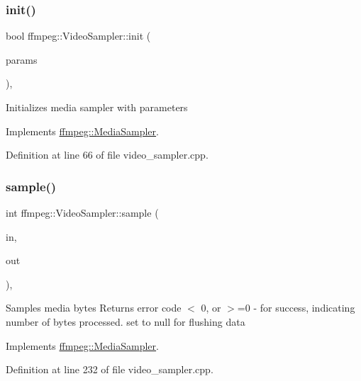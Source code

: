 \subsubsection{\texorpdfstring{init()}{init()}}
{\footnotesize\ttfamily bool ffmpeg\+::\+Video\+Sampler\+::init (\begin{DoxyParamCaption}\item[{const \hyperlink{structffmpeg_1_1SamplerParameters}{Sampler\+Parameters} \&}]{params }\end{DoxyParamCaption})\hspace{0.3cm}{\ttfamily [override]}, {\ttfamily [virtual]}}

Initializes media sampler with parameters 

Implements \hyperlink{classffmpeg_1_1MediaSampler_a049962d62fc930c67d6cf5aa89ae1948}{ffmpeg\+::\+Media\+Sampler}.



Definition at line 66 of file video\+\_\+sampler.\+cpp.

\mbox{\label{classffmpeg_1_1VideoSampler_aaafa56981b07358bd41603c06fc5e92c}} 
\subsubsection{\texorpdfstring{sample()}{sample()}}
{\footnotesize\ttfamily int ffmpeg\+::\+Video\+Sampler\+::sample (\begin{DoxyParamCaption}\item[{const \hyperlink{classffmpeg_1_1ByteStorage}{Byte\+Storage} $\ast$}]{in,  }\item[{\hyperlink{classffmpeg_1_1ByteStorage}{Byte\+Storage} $\ast$}]{out }\end{DoxyParamCaption})\hspace{0.3cm}{\ttfamily [override]}, {\ttfamily [virtual]}}

Samples media bytes Returns error code $<$ 0, or $>$=0 -\/ for success, indicating number of bytes processed. set  to null for flushing data 

Implements \hyperlink{classffmpeg_1_1MediaSampler_a1e13816018edada455769f027cf5e9dd}{ffmpeg\+::\+Media\+Sampler}.



Definition at line 232 of file video\+\_\+sampler.\+cpp.

